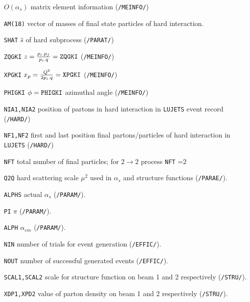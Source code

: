 \documentclass[10pt]{article} \usepackage{dina4}
\newcommand{\deflab}[1]{#1\hfil}%
\newenvironment{defl}[1]%
  {\begin{list}{}{\settowidth{\labelwidth}{#1}%
  \setlength{\leftmargin}{\labelwidth}%
  \addtolength{\leftmargin}{\labelsep}%
  \setlength{\itemsep}{0pt plus 1pt}
  \setlength{\parsep}{0pt plus 1pt}
  \setlength{\topsep}{0pt plus 1pt}
  \setlength{\partopsep}{0pt plus 1pt}
  \setlength{\parskip}{2mm plus 1mm minus 1mm}
  \let\makelabel\deflab}}%
  {\end{list}}
\begin{document}
\begin{defl}{123456789012345}
\item[ ] $O(\alpha_s)$ matrix element information
                         (\verb+/MEINFO/+)
\item[{\tt AM(18)}]
 vector of masses of final state particles of hard
                         interaction.
\item[{\tt SHAT}] $\hat{s}$ of hard subprocess (\verb+/PARAT/+)
\item[{\tt ZQGKI}] 
                $z=\frac{p_i.p_f}{p_i.q}=\verb+ZQGKI+$ (\verb+/MEINFO/+)
\item[{\tt XPGKI}]
              $x_p=\frac{Q^2}{2p_i.q}=\verb+XPGKI+$ (\verb+/MEINFO/+)
\item[{\tt PHIGKI}]  $\phi=\verb+PHIGKI+$ azimuthal
                     angle (\verb+/MEINFO/+)

\item[{\tt NIA1,NIA2}]
 position of partons in hard interaction in
                         \verb+LUJETS+ event record (\verb+/HARD/+)
\item[{\tt NF1,NF2}] first and last position final
                         partons/particles of
                         hard interaction in \verb+LUJETS+ (\verb+/HARD/+)
\item[{\tt NFT}] total number of final particles; for
                         $2 \rightarrow 2$ process \verb+NFT+ =2
                        

\item[{\tt Q2Q}] hard scattering scale $\mu ^2$ used in
                         $\alpha_s$ and structure functions (\verb+/PARAE/+).
\item[{\tt ALPHS}] actual $\alpha_s$ (\verb+/PARAM/+).
\item[{\tt PI}] $\pi$ (\verb+/PARAM/+).
\item[{\tt ALPH}] $\alpha_{em}$ (\verb+/PARAM/+).
\item[{\tt NIN}] 
number of trials for event generation (\verb+/EFFIC/+).
\item[{\tt NOUT}] number of successful generated events (\verb+/EFFIC/+).
\item[{\tt SCAL1,SCAL2}]
 scale for structure function on beam 1 and 2 
                               respectively (\verb+/STRU/+).
\item[{\tt XDP1,XPD2}] 
value of parton density on beam 1 and 2 
                               respectively (\verb+/STRU/+).


\end{defl}
\end{document}
